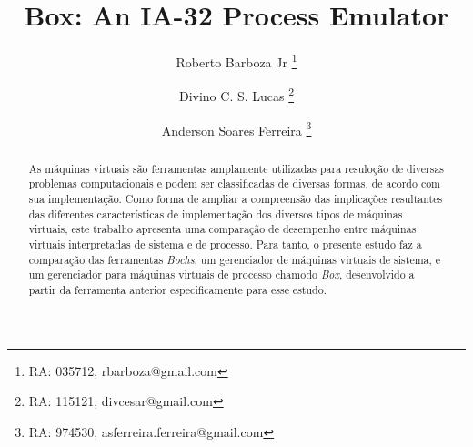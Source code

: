 \documentclass[11pt,twoside]{article}
\begin{document}
% 

%



\TRMakeCover


%
\pagestyle{myheadings}

%
\title{Box: An IA-32 Process Emulator}

\author{
 Roberto Barboza Jr
   \thanks{RA: 035712, rbarboza@gmail.com} \and
 Divino C. S. Lucas
   \thanks{RA: 115121, divcesar@gmail.com} \and
 Anderson Soares Ferreira
   \thanks{RA: 974530, asferreira.ferreira@gmail.com}
}

\date{}

\maketitle


\begin{abstract} 
 As máquinas virtuais são ferramentas amplamente utilizadas para resuloção de diversas problemas computacionais e podem ser classificadas de diversas formas, de acordo com sua implementação.
 Como forma de ampliar a compreensão das implicações resultantes das diferentes características de implementação dos diversos tipos de máquinas virtuais, este trabalho apresenta uma comparação de desempenho entre máquinas virtuais interpretadas de sistema e de processo.
 Para tanto, o presente estudo faz a comparação das ferramentas \emph{Bochs}, um gerenciador de máquinas virtuais de sistema, e um gerenciador para máquinas virtuais de processo chamodo \emph{Box}, desenvolvido a partir da ferramenta anterior especificamente para esse estudo.
\end{abstract}
\end{document}
